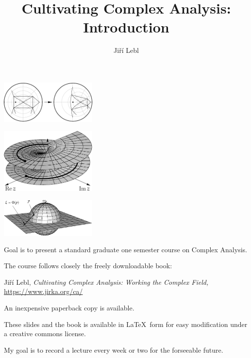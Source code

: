 \documentclass[10pt,aspectratio=169]{beamer}
\author{Ji\v{r}\'i Lebl}
\institute[OSU]{%
Departemento pri Matematiko de Oklahoma {\^S}tata Universitato}
\title{Cultivating Complex Analysis: Introduction}
\date{}
\begin{document}
\begin{frame}
\vspace*{-0.5in}
\titlepage

\vspace*{-0.5in}
\hspace*{-0.2in}
\includegraphics[width=1.9in]{../figures/varphiplot.pdf}

\vspace*{-1.0in}
\hspace*{1.84in}%
\includegraphics[width=1.9in]{../figures/arggraph2.pdf}%

\vspace*{-1.1in}
\hspace*{3.8in}%
\includegraphics[width=1.9in]{../figures/riemannsphere.pdf}%
\end{frame}

\begin{frame}
Goal is to present a standard graduate one semester
course on Complex Analysis.

\medskip
\pause

The course follows closely the freely downloadable book:

\medskip

Ji\v{r}\'i Lebl,
\emph{Cultivating Complex Analysis: Working the Complex Field,}
\url{https://www.jirka.org/ca/}

\medskip

An inexpensive paperback copy is available.

\medskip
\pause

These slides and the book is available in \LaTeX\ form for easy modification
under a creative commons license.

\medskip
\pause

My goal is to record a lecture every week or two for the forseeable future.


\end{frame}
\end{document}
